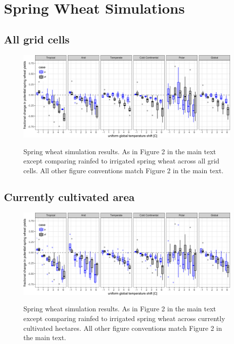 \documentclass[10pt]{article}
\begin{document}
\clearpage
\section{Spring Wheat Simulations}
\subsection{All grid cells}
\begin{figure}[h!]
\includegraphics[width=\textwidth]{s_spring_wheat_sim_CG.png}\\
\caption{Spring wheat simulation results. As in Figure 2 in the main text except comparing rainfed to irrigated spring wheat across all grid cells. All other figure conventions match Figure 2 in the main text.}
\label{fig:maizeCG}
\end{figure}

\subsection{Currently cultivated area}
\begin{figure}[h!]
\includegraphics[width=\textwidth]{s_spring_wheat_sim_CG_area_weight.png}\\
\caption{Spring wheat simulation results. As in Figure 2 in the main text except comparing rainfed to irrigated spring wheat across currently cultivated hectares. All other figure conventions match Figure 2 in the main text.}
\label{fig:maizeCG}
\end{figure}
\end{document}
